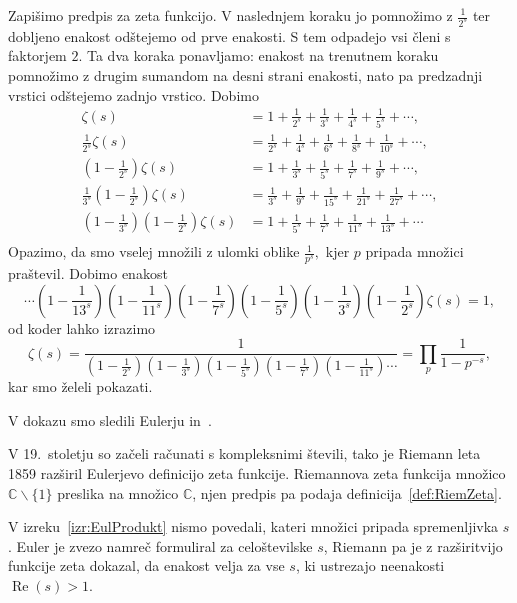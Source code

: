\documentclass[mat1]{fmfdelo}
\DeclareMathOperator{\re}{Re}
\begin{document}
\begin{dokaz}
Zapišimo predpis za zeta funkcijo. V naslednjem koraku jo pomnožimo z $\frac{1}{2^s}$ ter dobljeno enakost odštejemo od prve enakosti. S tem odpadejo vsi členi s faktorjem $2$. Ta dva koraka ponavljamo: enakost na trenutnem koraku pomnožimo z drugim sumandom na desni strani enakosti, nato pa predzadnji vrstici odštejemo zadnjo vrstico. Dobimo
\begin{align*}
	\zeta(s) &= 1 + \frac{1}{2^s} + \frac{1}{3^s} + \frac{1}{4^s} + \frac{1}{5^s} + \cdots, \nonumber \\
	\frac{1}{2^s} \zeta(s) &= \frac{1}{2^s} + \frac{1}{4^s} + \frac{1}{6^s} + \frac{1}{8^s} + \frac{1}{10^s} + \cdots, \nonumber \\
	\left(1-\frac{1}{2^s}\right) \zeta(s) &= 1 + \frac{1}{3^s} + \frac{1}{5^s} + \frac{1}{7^s} + \frac{1}{9^s} + \cdots, \nonumber \\
	\frac{1}{3^s} \left(1-\frac{1}{2^s}\right) \zeta(s) &= \frac{1}{3^s} + \frac{1}{9^s} + \frac{1}{15^s} + \frac{1}{21^s} + \frac{1}{27^s} + \cdots, \nonumber \\
	\left(1-\frac{1}{3^s}\right)\left (1-\frac{1}{2^s}\right) \zeta(s) &= 1 + \frac{1}{5^s} + \frac{1}{7^s} + \frac{1}{11^s} + \frac{1}{13^s} + \cdots \nonumber \\
\end{align*}
Opazimo, da smo vselej množili z ulomki oblike $\frac{1}{p^s},$ kjer $p$ pripada množici praštevil. Dobimo enakost
	\[ \cdots \left(1-\frac{1}{13^s}\right) \left(1-\frac{1}{11^s}\right) \left(1-\frac{1}{7^s}\right) \left(1-\frac{1}{5^s}\right) \left(1-\frac{1}{3^s}\right) 		\left(1-\frac{1}{2^s}\right) \zeta(s) = 1, \]
od koder lahko izrazimo
	\[ \zeta(s) = \frac{1}{ \left(1-\frac{1}{2^s}\right) \left(1-\frac{1}{3^s}\right) \left(1-\frac{1}{5^s}\right) \left(1-\frac{1}{7^s}\right) \left(1-\frac{1}{11^s}\right) \cdots} = \prod_{p}\frac{1}{1-p^{-s}}, \]
kar smo želeli pokazati.
\end{dokaz}

V dokazu smo sledili Eulerju in~\cite{riemannHyp}.

V 19.~stoletju so začeli računati s kompleksnimi števili, tako je Riemann leta 1859 razširil Eulerjevo definicijo zeta funkcije. Riemannova zeta funkcija množico  $\mathbb{C}\backslash\{1\}$ preslika na množico  $\mathbb{C}$, njen predpis pa podaja definicija~\ref{def:RiemZeta}.

\begin{opomba}
V izreku~\ref{izr:EulProdukt} nismo povedali, kateri množici pripada spremenljivka $s$. Euler je zvezo namreč formuliral za celoštevilske $s$, Riemann pa je z razširitvijo funkcije zeta dokazal, da enakost velja za vse $s$, ki ustrezajo neenakosti $\re(s)>1$.
\end{opomba}
\end{document}
